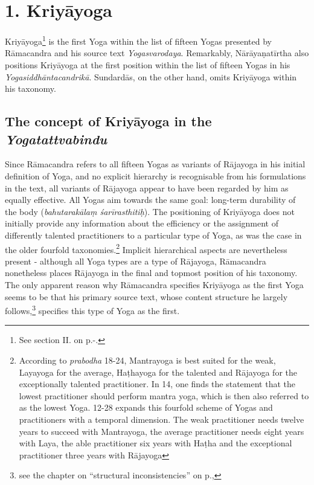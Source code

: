 \section{1. Kriyāyoga}

Kriyāyoga\footnote{See section II. on p.\pageref{kriyayogastart}-\pageref{kriyayogaend}.} is the first Yoga within the list of fifteen Yogas presented by Rāmacandra and his source text \textit{Yogasvarodaya}. Remarkably, Nārāyaṇatīrtha also positions Kriyāyoga at the first position within the list of fifteen Yogas in his \textit{Yogasiddhāntacandrikā}. Sundardās, on the other hand, omits Kriyāyoga within his taxonomy.

\subsection{The concept of Kriyāyoga in the \textit{Yogatattvabindu}}

Since Rāmacandra refers to all fifteen Yogas as variants of Rājayoga in his initial definition of Yoga, and no explicit hierarchy is recognisable from his formulations in the text, all variants of Rājayoga appear to have been regarded by him as equally effective. All Yogas aim towards the same goal: long-term durability of the body (\textit{bahutarakālaṃ śarīrasthitiḥ}). The positioning of Kriyāyoga does not initially provide any information about the efficiency or the assignment of differently talented practitioners to a particular type of Yoga, as was the case in the older fourfold taxonomies.\footnote{According to \textit{prabodha} 18-24, Mantrayoga is best suited for the weak, Layayoga for the average, Haṭhayoga for the talented and Rājayoga for the exceptionally talented practitioner. In  14, one finds the statement that the lowest practitioner should perform mantra yoga, which is then also referred to as the lowest Yoga.  12-28 expands this fourfold scheme of Yogas and practitioners with a temporal dimension. The weak practitioner needs twelve years to succeed with Mantrayoga, the average practitioner needs eight years with Laya, the able practitioner six years with Haṭha and the exceptional practitioner three years with Rājayoga} Implicit hierarchical aspects are nevertheless present - although all Yoga types are a type of Rājayoga, Rāmacandra nonetheless places Rājayoga in the final and topmost position of his taxonomy.
The only apparent reason why Rāmacandra specifies Kriyāyoga as the first Yoga seems to be that his primary source text, whose content structure he largely follows,\footnote{see the chapter on ``structural inconsistencies'' on p.\pageref{struktur},} specifies this type of Yoga as the first.

